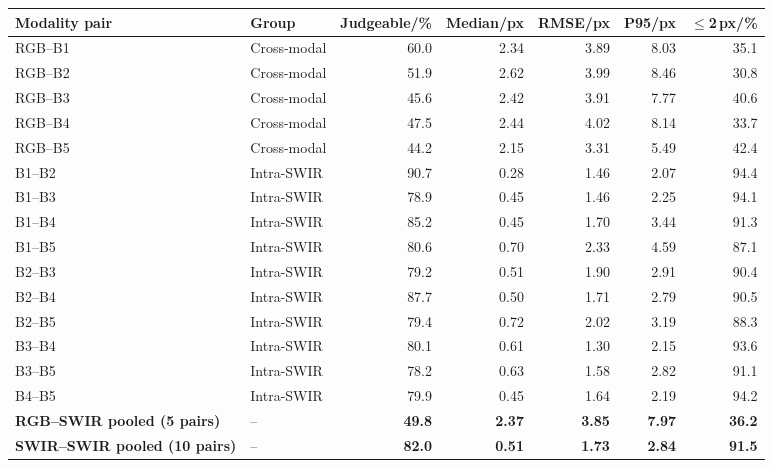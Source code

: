 \begin{tabular}{@{}llrrrrr@{}}
\toprule
Modality pair & Group & Judgeable/\% & Median/px & RMSE/px & P95/px & $\le$2\,px/\%\\
\midrule
RGB--B1 & Cross-modal & 60.0 & 2.34 & 3.89 & 8.03 & 35.1\\
RGB--B2 & Cross-modal & 51.9 & 2.62 & 3.99 & 8.46 & 30.8\\
RGB--B3 & Cross-modal & 45.6 & 2.42 & 3.91 & 7.77 & 40.6\\
RGB--B4 & Cross-modal & 47.5 & 2.44 & 4.02 & 8.14 & 33.7\\
RGB--B5 & Cross-modal & 44.2 & 2.15 & 3.31 & 5.49 & 42.4\\
B1--B2 & Intra-SWIR & 90.7 & 0.28 & 1.46 & 2.07 & 94.4\\
B1--B3 & Intra-SWIR & 78.9 & 0.45 & 1.46 & 2.25 & 94.1\\
B1--B4 & Intra-SWIR & 85.2 & 0.45 & 1.70 & 3.44 & 91.3\\
B1--B5 & Intra-SWIR & 80.6 & 0.70 & 2.33 & 4.59 & 87.1\\
B2--B3 & Intra-SWIR & 79.2 & 0.51 & 1.90 & 2.91 & 90.4\\
B2--B4 & Intra-SWIR & 87.7 & 0.50 & 1.71 & 2.79 & 90.5\\
B2--B5 & Intra-SWIR & 79.4 & 0.72 & 2.02 & 3.19 & 88.3\\
B3--B4 & Intra-SWIR & 80.1 & 0.61 & 1.30 & 2.15 & 93.6\\
B3--B5 & Intra-SWIR & 78.2 & 0.63 & 1.58 & 2.82 & 91.1\\
B4--B5 & Intra-SWIR & 79.9 & 0.45 & 1.64 & 2.19 & 94.2\\
\midrule
\textbf{RGB--SWIR pooled (5 pairs)} & -- & \textbf{49.8} & \textbf{2.37} & \textbf{3.85} & \textbf{7.97} & \textbf{36.2}\\
\textbf{SWIR--SWIR pooled (10 pairs)} & -- & \textbf{82.0} & \textbf{0.51} & \textbf{1.73} & \textbf{2.84} & \textbf{91.5}\\
\bottomrule
\end{tabular}
